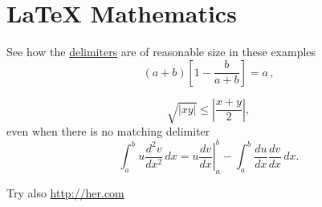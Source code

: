 \section{LaTeX Mathematics}
\label{sec:latexmath}
See how the \href{http://del.com}{delimiters} are of reasonable size in these examples
\begin{equation}
\label{eq:del1}
	\left(a+b\right)\left[1-\frac{b}{a+b}\right]=a\,,
\end{equation}

\[
	\sqrt{|xy|}\leq\left|\frac{x+y}{2}\right|,
\]
even when there is no matching delimiter
\[
	\int_a^bu\frac{d^2v}{dx^2}\,dx
	=\left.u\frac{dv}{dx}\right|_a^b
	-\int_a^b\frac{du}{dx}\frac{dv}{dx}\,dx.
\]

Try also \url{http://her.com}

